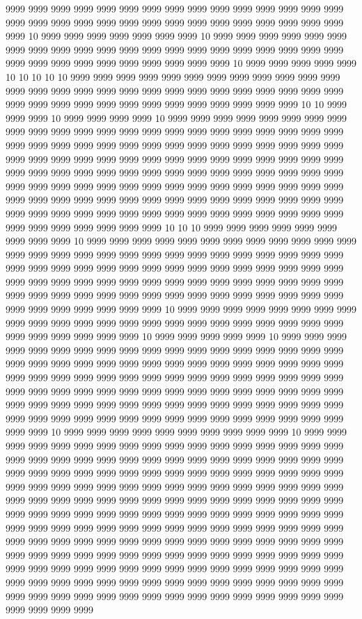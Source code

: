 9999 9999 9999 9999 9999 9999 9999 9999 9999 9999 9999 9999 9999 9999 9999 9999 9999 9999 9999 9999 9999 9999 9999 9999 9999 9999 9999 9999 9999 9999 9999 10 9999 9999 9999 9999 9999 9999 9999 10 9999 9999 9999 9999 9999 9999 9999 9999 9999 9999 9999 9999 9999 9999 9999 9999 9999 9999 9999 9999 9999 9999 9999 9999 9999 9999 9999 9999 9999 9999 9999 10 9999 9999 9999 9999 9999 10 10 10 10 10 9999 9999 9999 9999 9999 9999 9999 9999 9999 9999 9999 9999 9999 9999 9999 9999 9999 9999 9999 9999 9999 9999 9999 9999 9999 9999 9999 9999 9999 9999 9999 9999 9999 9999 9999 9999 9999 9999 9999 9999 10 10 9999 9999 9999 10 9999 9999 9999 9999 10 9999 9999 9999 9999 9999 9999 9999 9999 9999 9999 9999 9999 9999 9999 9999 9999 9999 9999 9999 9999 9999 9999 9999 9999 9999 9999 9999 9999 9999 9999 9999 9999 9999 9999 9999 9999 9999 9999 9999 9999 9999 9999 9999 9999 9999 9999 9999 9999 9999 9999 9999 9999 9999 9999 9999 9999 9999 9999 9999 9999 9999 9999 9999 9999 9999 9999 9999 9999 9999 9999 9999 9999 9999 9999 9999 9999 9999 9999 9999 9999 9999 9999 9999 9999 9999 9999 9999 9999 9999 9999 9999 9999 9999 9999 9999 9999 9999 9999 9999 9999 9999 9999 9999 9999 9999 9999 9999 9999 9999 9999 9999 9999 9999 9999 9999 9999 9999 9999 9999 9999 10 10 10 9999 9999 9999 9999 9999 9999 9999 9999 9999 10 9999 9999 9999 9999 9999 9999 9999 9999 9999 9999 9999 9999 9999 9999 9999 9999 9999 9999 9999 9999 9999 9999 9999 9999 9999 9999 9999 9999 9999 9999 9999 9999 9999 9999 9999 9999 9999 9999 9999 9999 9999 9999 9999 9999 9999 9999 9999 9999 9999 9999 9999 9999 9999 9999 9999 9999 9999 9999 9999 9999 9999 9999 9999 9999 9999 9999 9999 9999 9999 9999 9999 9999 9999 9999 9999 9999 9999 9999 9999 10 9999 9999 9999 9999 9999 9999 9999 9999 9999 9999 9999 9999 9999 9999 9999 9999 9999 9999 9999 9999 9999 9999 9999 9999 9999 9999 9999 9999 9999 10 9999 9999 9999 9999 9999 10 9999 9999 9999 9999 9999 9999 9999 9999 9999 9999 9999 9999 9999 9999 9999 9999 9999 9999 9999 9999 9999 9999 9999 9999 9999 9999 9999 9999 9999 9999 9999 9999 9999 9999 9999 9999 9999 9999 9999 9999 9999 9999 9999 9999 9999 9999 9999 9999 9999 9999 9999 9999 9999 9999 9999 9999 9999 9999 9999 9999 9999 9999 9999 9999 9999 9999 9999 9999 9999 9999 9999 9999 9999 9999 9999 9999 9999 9999 9999 9999 9999 9999 9999 9999 9999 9999 9999 9999 9999 9999 9999 9999 9999 9999 9999 10 9999 9999 9999 9999 9999 9999 9999 9999 9999 9999 10 9999 9999 9999 9999 9999 9999 9999 9999 9999 9999 9999 9999 9999 9999 9999 9999 9999 9999 9999 9999 9999 9999 9999 9999 9999 9999 9999 9999 9999 9999 9999 9999 9999 9999 9999 9999 9999 9999 9999 9999 9999 9999 9999 9999 9999 9999 9999 9999 9999 9999 9999 9999 9999 9999 9999 9999 9999 9999 9999 9999 9999 9999 9999 9999 9999 9999 9999 9999 9999 9999 9999 9999 9999 9999 9999 9999 9999 9999 9999 9999 9999 9999 9999 9999 9999 9999 9999 9999 9999 9999 9999 9999 9999 9999 9999 9999 9999 9999 9999 9999 9999 9999 9999 9999 9999 9999 9999 9999 9999 9999 9999 9999 9999 9999 9999 9999 9999 9999 9999 9999 9999 9999 9999 9999 9999 9999 9999 9999 9999 9999 9999 9999 9999 9999 9999 9999 9999 9999 9999 9999 9999 9999 9999 9999 9999 9999 9999 9999 9999 9999 9999 9999 9999 9999 9999 9999 9999 9999 9999 9999 9999 9999 9999 9999 9999 9999 9999 9999 9999 9999 9999 9999 9999 9999 9999 9999 9999 9999 9999 9999 9999 9999 9999 9999 9999 9999 